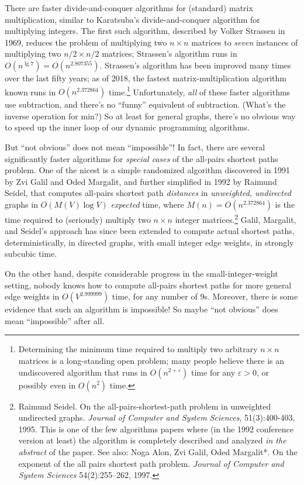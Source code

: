 There are faster divide-and-conquer algorithms for (standard) matrix multiplication, similar to Karatsuba’s divide-and-conquer algorithm for multiplying integers.
The first such algorithm, described by Volker Strassen in 1969, reduces the problem of multiplying two $n \times n$ matrices to \textit{seven} instances of multiplying two $n/2 \times n/2$ matrices; Strassen’s algorithm runs in $O(n^{\lg 7}) = O(n^{2.807355})$.
Strassen’s algorithm has been improved many times over the last fifty years; as of 2018, the fastest matrix-multiplication algorithm known runs in $O(n^{2.372864})$ time.\footnote{Determining the minimum time required to multiply two arbitrary $n \times n$ matrices is a long-standing open problem; many people believe there is an undiscovered algorithm that runs in $O(n^{2+\varepsilon})$ time for any $\varepsilon > 0$, or possibly even in $O(n^2)$ time.}
Unfortunately, \textit{all} of these faster algorithms use subtraction, and there’s no “funny” equivalent of subtraction. (What’s the inverse operation for min?) So at least for general graphs, there’s no obvious way to speed up the inner loop of our dynamic programming algorithms.

But “not obvious” does not mean “impossible”!
In fact, there are several significantly faster algorithms for \textit{special cases} of the all-pairs shortest paths problem.
One of the nicest is a simple randomized algorithm discovered in 1991 by Zvi Galil and Oded Margalit, and further simplified in 1992 by Raimund Seidel, that computes all-pairs shortest path \textit{distances} in \textit{unweighted, undirected} graphs in $O(M(V) \log V)$ \textit{expected} time, where $M(n) = O(n^{2.372864})$ is the time required to (seriously) multiply two $n \times n$ integer matrices.\footnote{Raimund Seidel. On the all-pairs-shortest-path problem in unweighted undirected graphs. \textit{Journal of Computer and System Sciences}, 51(3):400-403, 1995. This is one of the few algorithms papers where (in the 1992 conference version at least) the algorithm is completely described and analyzed \textit{in the abstract} of the paper. See also: Noga Alon, Zvi Galil, Oded Margalit*. On the exponent of the all pairs shortest path problem. \textit{Journal of Computer and System Sciences} 54(2):255–262, 1997.}
Galil, Margalit, and Seidel’s approach has since been extended to compute actual shortest paths, deterministically, in directed graphs, with small integer edge weights, in strongly subcubic time.

On the other hand, despite considerable progress in the small-integer-weight setting, nobody knows how to compute all-pairs shortest paths for more general edge weights in $O(V^{2.999999})$ time, for any number of $9$s.
Moreover, there is some evidence that such an algorithm is impossible!
So maybe “not obvious” does mean “impossible” after all.

